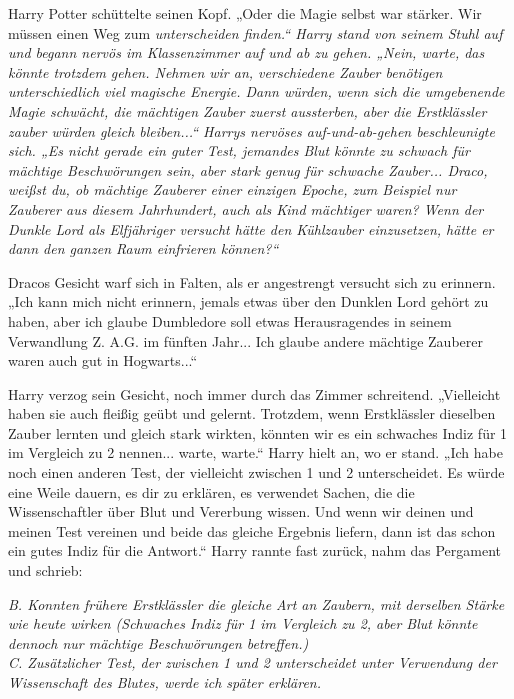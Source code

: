 {Harry Potter schüttelte seinen Kopf. „Oder die Magie selbst war stärker. Wir müssen einen Weg zum \emph{unterscheiden finden.“ Harry stand von seinem Stuhl auf und begann nervös im Klassenzimmer auf und ab zu gehen. „Nein, warte, das könnte trotzdem gehen. Nehmen wir an, verschiedene Zauber benötigen unterschiedlich viel magische Energie. Dann würden, wenn sich die umgebenende Magie schwächt, die mächtigen Zauber zuerst aussterben, aber die Erstklässler zauber würden gleich bleiben...“ Harrys nervöses auf-und-ab-gehen beschleunigte sich. „Es nicht gerade ein guter Test, jemandes Blut könnte zu schwach für mächtige Beschwörungen sein, aber stark genug für schwache Zauber... Draco, weißst du, ob mächtige Zauberer einer einzigen Epoche, zum Beispiel nur Zauberer aus diesem Jahrhundert, auch als Kind mächtiger waren? Wenn der Dunkle Lord als Elfjähriger versucht hätte den Kühlzauber einzusetzen, hätte er dann den ganzen Raum einfrieren können?“}

Dracos Gesicht warf sich in Falten, als er angestrengt versucht sich zu erinnern. „Ich kann mich nicht erinnern, jemals etwas über den Dunklen Lord gehört zu haben, aber ich glaube Dumbledore soll etwas Herausragendes in seinem Verwandlung Z. A.G. im fünften Jahr... Ich glaube andere mächtige Zauberer waren auch gut in Hogwarts...“

Harry verzog sein Gesicht, noch immer durch das Zimmer schreitend. „Vielleicht haben sie auch fleißig geübt und gelernt. Trotzdem, wenn Erstklässler dieselben Zauber lernten und gleich stark wirkten, könnten wir es ein schwaches Indiz für 1 im Vergleich zu 2 nennen... warte, warte.“ Harry hielt an, wo er stand. „Ich habe noch einen anderen Test, der vielleicht zwischen 1 und 2 unterscheidet. Es würde eine Weile dauern, es dir zu erklären, es verwendet Sachen, die die Wissenschaftler über Blut und Vererbung wissen. Und wenn wir deinen und meinen Test vereinen und beide das gleiche Ergebnis liefern, dann ist das schon ein gutes Indiz für die Antwort.“ Harry rannte fast zurück, nahm das Pergament und schrieb:

\emph{B. K\emph{onnten frühere Erstklässler die gleiche Art an Zaubern, mit derselben} \emph{Stärke wie heute} \emph{wirken} \emph{(Schwaches Indiz für 1 im Vergleich zu 2, aber Blut könnte dennoch nur mächtige Beschwörungen betreffen.)}}\\ \emph{C. Zusätzlicher Test, der zwischen 1 und 2 unterscheidet unter Verwendung der Wissenschaft des Blutes, werde ich später erklären.}

}
